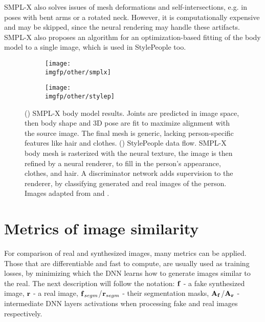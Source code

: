 SMPL-X also solves issues of mesh deformations and self-intersections, e.g. in poses with bent arms or a rotated neck. However, it is computationally expensive and may be skipped, since the neural rendering may handle these artifacts. SMPL-X also proposes an algorithm for an optimization-based fitting of the body model to a single image, which is used in StylePeople too. 

\begin{figure}[h!]
	\setlength\abovedisplayskip{0pt}
	\centering
	\begin{subfigure}[b]{0.39\textwidth}
		\centering
		\texttt{[image: \\imgfp/other/smplx]}
		\caption{}
		\label{lit:fig:smplx}
	\end{subfigure}
	\hfill
	\begin{subfigure}[b]{0.60\textwidth}
		\centering
		\texttt{[image: \\imgfp/other/stylep]}
		\caption{}
		\label{lit:fig:stylepeople}
	\end{subfigure}
	\label{lit:fig:avatars}
	\vspace*{-2em}
	\caption{(\protect{}) SMPL-X body model results. Joints are predicted in image space, then body shape and 3D pose are fit to maximize alignment with the source image. The final mesh is generic, lacking person-specific features like hair and clothes. (\protect{}) StylePeople data flow. SMPL-X body mesh is rasterized with the neural texture, the image is then refined by a neural renderer, to fill in the person's appearance, clothes, and hair. A discriminator network adds supervision to the renderer, by classifying generated and real images of the person. Images adapted from \cite{dnn:smplx19} and \cite{dnn:stylepeople21}.}
	\setlength\belowdisplayskip{0pt}
\end{figure}
\vspace*{-2em}
\section{Metrics of image similarity}
\label{lit:metrics}

For comparison of real and synthesized images, many metrics can be applied. Those that are differentiable and fast to compute, are usually used as training losses, by minimizing which the DNN learns how to generate images similar to the real. The next description will follow the notation: $\bm{\mathrm{f}}$ - a fake synthesized image, $\bm{\mathrm{r}}$ - a real image, $\bm{\mathrm{f}}_{segm}$/$\bm{\mathrm{r}}_{segm}$ - their segmentation masks, $\bm{\mathrm{A_f}}$/$\bm{\mathrm{A_r}}$ - intermediate DNN layers activations when processing fake and real images respectively.

